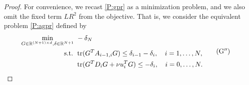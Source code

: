 \documentclass[12pt]{article}
\numberwithin{equation}{section}
\theoremstyle{definition}
\theoremstyle{remark}
\DeclareMathOperator{\trace}{tr}
\begin{document}
\begin{proof}
For convenience,  we recast \eqref{P:gpr} as a minimization problem, and we also omit the
fixed term $LR^2$ from the objective. That is, we consider the equivalent problem \eqref{P:agpr}
defined by
\begin{align*}
    \begin{aligned}
    \min_{G\in \mathbb{R}^{(N+1)\times d},\delta \in\mathbb{R}^{N+1}}\ &  -\delta_N \\
    \text{s.t. }
                        & \trace (G^T A_{i-1,i} G) \leq \delta_{i-1} - \delta_i,\quad    i=1,\dots,N, \\
                        & \trace(G^T D_i G+ \nu u_i^T G ) \leq - \delta_i,\quad     i=0,\dots,N.
    \end{aligned}
    \tag{G$^{\prime\prime}$}\label{P:agpr}
\end{align*}


\end{proof}
\end{document}
